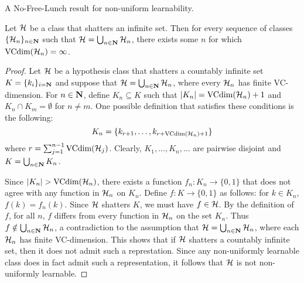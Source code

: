 A No-Free-Lunch result for non-uniform learnability.
\begin{theorem}
\label{thm:NFL_NUL}
Let $\mathcal{H}$ be a class that shatters an infinite set. Then for every
sequence of classes $\{ \mathcal{H}_n \}_{n \in \mathbf{N}}$ such that
$\mathcal{H} = \bigcup_{n \in \mathbf{N}} \mathcal{H}_n$, there exists some $n$
for which $\text{VCdim} (\mathcal{H}_n) = \infty$.
\begin{proof}
Let $\mathcal{H}$ be a hypothesis class that shatters a countably infinite
set $K = \{k_i\}_{i = \mathbf{N}}$ and suppose that $\mathcal{H} = \bigcup_{n \in \mathbf{N}} \mathcal{H}_n$,
where every $\mathcal{H}_n$ has finite VC-dimension. For $n \in \mathbf{N}$,
define $K_n \subseteq K$ such that $|K_n| = \text{VCdim} (\mathcal{H}_n) + 1$ and
$K_n \cap K_m = \emptyset$ for $n \neq m$. One possible definition that
satisfies these conditions is the following:
\[
    K_n = \{k_{r + 1}, \ldots, k_{r + \text{VCdim}(\mathcal{H}_n) + 1}\}
\]
where $r = \sum_{j = 1}^{n - 1} \text{VCdim} (\mathcal{H}_j)$. Clearly, $K_1, \ldots, K_n, \ldots$
are pairwise disjoint and $K = \bigcup_{n \in \mathbf{N}} K_n$.

Since $|K_n| > \text{VCdim} (\mathcal{H}_n)$, there exists a function $f_n \colon K_n \rightarrow \{0, 1\}$
that does not agree with any function in $\mathcal{H}_n$ on $K_n$. Define
$f \colon K \rightarrow \{0, 1\}$ as follows: for $k \in K_n$, $f(k) = f_n(k)$. Since
$\mathcal{H}$ shatters $K$, we must have $f \in \mathcal{H}$. By the definition of $f$,
for all $n$, $f$ differs from every function in $\mathcal{H}_n$ on the set $K_n$. Thus
$f \notin \bigcup_{n \in \mathbf{N}} \mathcal{H}_n$, a contradiction to the assumption
that $\mathcal{H} = \bigcup_{n \in \mathbf{N}} \mathcal{H}_n$, where each $\mathcal{H}_n$
has finite VC-dimension. This shows that if $\mathcal{H}$ shatters a countably
infinite set, then it does not admit such a represtation. Since any
non-uniformly learnable class does in fact admit such a representation, it
follows that $\mathcal{H}$ is not non-uniformly learnable.
\end{proof}
\end{theorem}
